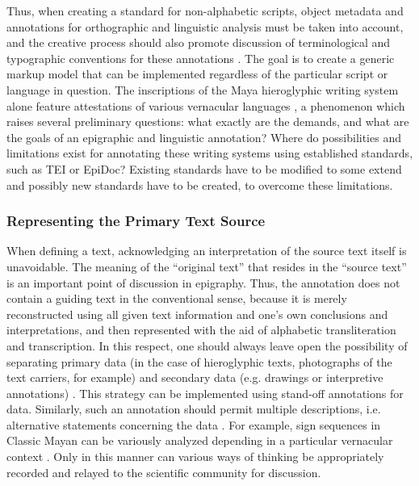 \documentclass[amsthm,ebook]{saparticle}
\begin{document}
Thus, when creating a standard for non-alphabetic scripts, object metadata and annotations for orthographic and
linguistic analysis must be taken into account, and the creative process should also promote discussion of
terminological and typographic conventions for these annotations \citep{SachseDürr2015}. The goal is to create a generic
markup model that can be implemented regardless of the particular script or language in question. The inscriptions of
the Maya hieroglyphic writing system alone feature attestations of various vernacular languages \citep{LacadenaWichmann2002}, a phenomenon which raises several preliminary questions: what exactly are the demands, and what are the goals of
an epigraphic and linguistic annotation? Where do possibilities and limitations exist for annotating these writing
systems using established standards, such as TEI or EpiDoc? Existing standards have to be modified to some extend and
possibly new standards have to be created, to overcome these limitations. 




\subsubsection[Representing the Primary Text Source]{Representing the Primary Text Source}
When defining a text, acknowledging an interpretation of the source text itself is unavoidable. The meaning of the
``original text'' that resides in the ``source text'' is an important point of discussion in epigraphy. Thus, the
annotation does not contain a guiding text in the conventional sense, because it is merely reconstructed using all
given text information and one’s own conclusions and interpretations, and then represented with the aid of alphabetic
transliteration and transcription. In this respect, one should always leave open the possibility of separating primary
data (in the case of hieroglyphic texts, photographs of the text carriers, for example) and secondary data (e.g.
drawings or interpretive annotations) \citep{Stührenberg2012}. This strategy can be implemented using stand-off annotations
for data. Similarly, such an annotation should permit multiple descriptions, i.e. alternative statements concerning the
data \citep{Stührenberg2012}. For example, sign sequences in Classic Mayan can be variously analyzed depending in a
particular vernacular context \citep{Gronemeyer2014}. Only in this manner can various ways of thinking be appropriately
recorded and relayed to the scientific community for discussion. 
\end{document}
